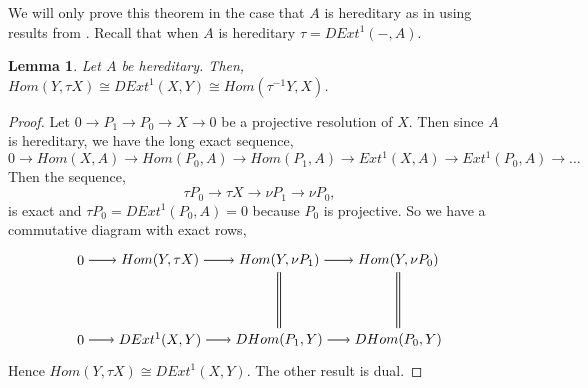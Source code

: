\documentclass[11.5pt, twoside, a4paper, titlepage]{report}
\theoremstyle{definition}
\theoremstyle{plain}
\newtheorem{lem}[mydef]{Lemma}
\begin{document}
We will only prove this theorem in the case that $A$ is hereditary as in \cite{CB3} using results from \cite{CB2}. Recall that when $A$ is hereditary $\tau =DExt^1(-,A)$.

\begin{lem} \label{adjointlem}
Let $A$ be hereditary. Then, $Hom(Y,\tau X) \cong DExt^1(X,Y) \cong Hom(\tau^{-1}Y,X)$.
\end{lem}
\begin{proof}
Let $0 \to P_1 \to P_0 \to X \to 0$ be a projective resolution of $X$. Then since $A$ is hereditary, we have the long exact sequence, 
\begin{equation*}
0 \to Hom(X, A) \to Hom(P_0, A) \to Hom(P_1, A) \to Ext^1(X, A) \to Ext^1(P_0, A) \to \dots
\end{equation*}
Then the sequence,
\begin{equation*}
\tau P_0 \to \tau X \to \nu P_1 \to \nu P_0,
\end{equation*}
is exact and $\tau P_0= DExt^1(P_0, A)=0$ because $P_0$ is projective. So we have a commutative diagram with exact rows,
\begin{equation*}
\begin{tikzpicture}[->,-latex, auto, main path/.style={->, semithick}, main node/.style={}]
\node	[main node]		(2) at (1,0)		{$0$};
\node	[main node]		(3) at (3,0)		{$Hom(Y,\tau X)$};
\node [main node]		(4) at (6,0)		{$Hom(Y, \nu P_1)$};
\node [main node]		(5) at (9,0)		{$Hom(Y, \nu P_0)$};

\node	[main node]		(15) at (1,-2)		{$0$};
\node	[main node]		(16) at (3,-2)		{$DExt^1(X,Y)$};
\node [main node]		(17) at (6,-2)		{$DHom(P_1, Y)$};
\node [main node]		(18) at (9,-2)		{$DHom(P_0, Y)$};

\draw (2) edge [main path] node [auto] {$$} (3);
\draw (3) edge [main path] node [auto] {$$} (4);
\draw (4) edge [main path] node [auto] {$$} (5);

\draw (15) edge [main path] node [auto] {$$} (16);
\path (16) edge [main path] node [auto] {$$} (17);
\draw (17) edge [main path] node [auto] {$$} (18);

\draw (17) edge [-, double, semithick, double distance=1.5pt] (4);
\draw (18) edge [-, double, semithick, double distance=1.5pt] (5);
\end{tikzpicture}
\end{equation*}
Hence $Hom(Y, \tau X) \cong DExt^1(X,Y)$. The other result is dual.
\end{proof}
\end{document}
